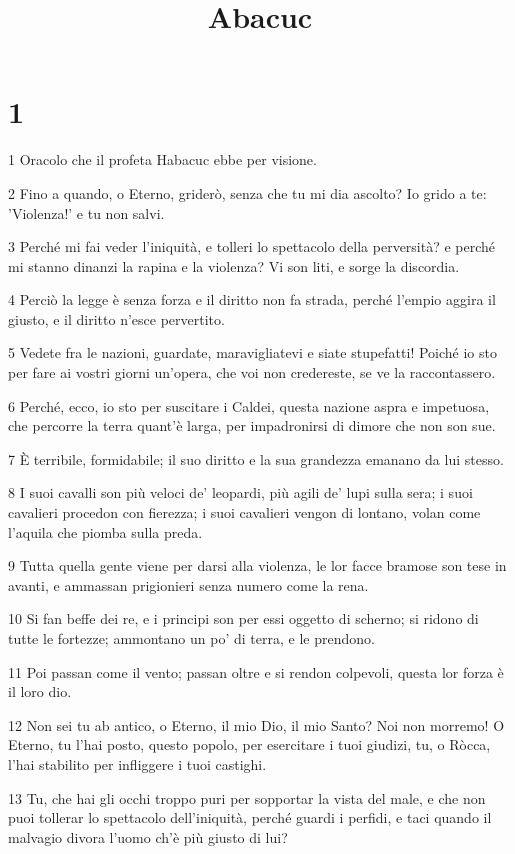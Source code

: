 

\title{Abacuc}


\chapter{1}

\par 1 Oracolo che il profeta Habacuc ebbe per visione.
\par 2 Fino a quando, o Eterno, griderò, senza che tu mi dia ascolto? Io grido a te: 'Violenza!' e tu non salvi.
\par 3 Perché mi fai veder l'iniquità, e tolleri lo spettacolo della perversità? e perché mi stanno dinanzi la rapina e la violenza? Vi son liti, e sorge la discordia.
\par 4 Perciò la legge è senza forza e il diritto non fa strada, perché l'empio aggira il giusto, e il diritto n'esce pervertito.
\par 5 Vedete fra le nazioni, guardate, maravigliatevi e siate stupefatti! Poiché io sto per fare ai vostri giorni un'opera, che voi non credereste, se ve la raccontassero.
\par 6 Perché, ecco, io sto per suscitare i Caldei, questa nazione aspra e impetuosa, che percorre la terra quant'è larga, per impadronirsi di dimore che non son sue.
\par 7 È terribile, formidabile; il suo diritto e la sua grandezza emanano da lui stesso.
\par 8 I suoi cavalli son più veloci de' leopardi, più agili de' lupi sulla sera; i suoi cavalieri procedon con fierezza; i suoi cavalieri vengon di lontano, volan come l'aquila che piomba sulla preda.
\par 9 Tutta quella gente viene per darsi alla violenza, le lor facce bramose son tese in avanti, e ammassan prigionieri senza numero come la rena.
\par 10 Si fan beffe dei re, e i principi son per essi oggetto di scherno; si ridono di tutte le fortezze; ammontano un po' di terra, e le prendono.
\par 11 Poi passan come il vento; passan oltre e si rendon colpevoli, questa lor forza è il loro dio.
\par 12 Non sei tu ab antico, o Eterno, il mio Dio, il mio Santo? Noi non morremo! O Eterno, tu l'hai posto, questo popolo, per esercitare i tuoi giudizi, tu, o Ròcca, l'hai stabilito per infliggere i tuoi castighi.
\par 13 Tu, che hai gli occhi troppo puri per sopportar la vista del male, e che non puoi tollerar lo spettacolo dell'iniquità, perché guardi i perfidi, e taci quando il malvagio divora l'uomo ch'è più giusto di lui?
